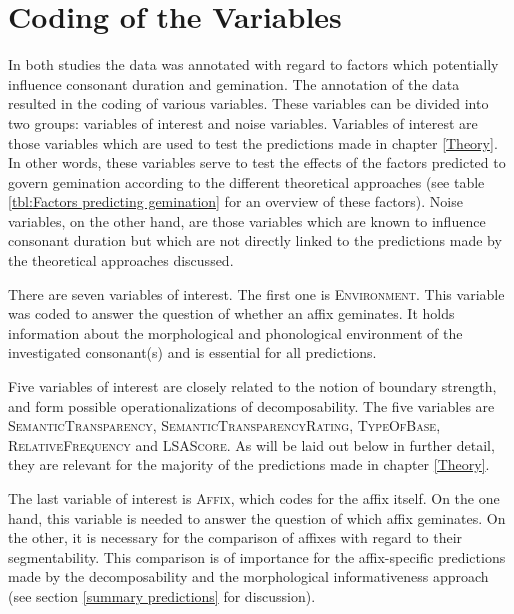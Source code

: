 \section{Coding of the Variables} \label{General method annotation}



In both studies the data was annotated with regard to factors which potentially influence consonant duration and gemination. The annotation of the data resulted in the coding of various variables.
 These variables can be divided into two groups: variables of interest and noise variables. Variables of interest are those variables which are used to test the predictions made in chapter \ref{Theory}. In other words, these variables serve to test the effects of the factors predicted to govern gemination according to the different theoretical approaches (see table \ref{tbl:Factors predicting gemination} for an overview of these factors).
Noise variables, on the other hand, are those variables which are known to influence consonant duration but which are not directly linked to the predictions made by the theoretical approaches discussed.

There are seven variables of interest. The first one is \textsc{Environment}. This variable was coded to answer the question of whether an affix geminates. It holds information about the morphological and phonological environment of the investigated consonant(s) and is essential for all predictions.


Five variables of interest are closely related to the notion of boundary strength,  and form possible operationalizations of decomposability. The five variables are \textsc{SemanticTransparency}, \textsc{SemanticTransparencyRating}, \textsc{TypeOfBase}, \textsc{RelativeFrequency} and \textsc{LSAScore}. As will be laid out below in further detail, they are relevant for the majority of the predictions made in chapter \ref{Theory}. 


The last variable of interest is \textsc{Affix}, which codes for the affix itself. On the one hand, this variable is needed to answer the question of which affix geminates. On the other, it is necessary for the comparison of affixes with regard to their segmentability. This comparison is of importance for the affix-specific predictions made by the decomposability and the morphological informativeness approach (see section \ref{summary predictions} for discussion). 


